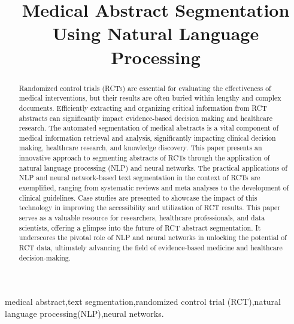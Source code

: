 \documentclass[conference]{IEEEtran}
\begin{document}
\title{Medical Abstract Segmentation Using Natural Language Processing\\}

\author{
\and
{}
\and
{}
\and
{}
}
\maketitle

\begin{abstract}
Randomized control trials (RCTs) are essential for
evaluating the effectiveness of medical interventions, but their
results are often buried within lengthy and complex documents.
Efficiently extracting and organizing critical information from
RCT abstracts can significantly impact evidence-based decision making
and healthcare research. The automated segmentation
of medical abstracts is a vital component of medical information
retrieval and analysis, significantly impacting clinical decision making,
healthcare research, and knowledge discovery. This
paper presents an innovative approach to segmenting abstracts
of RCTs through the application of natural language processing
(NLP) and neural networks. The practical applications of NLP
and neural network-based text segmentation in the context of
RCTs are exemplified, ranging from systematic reviews and meta analyses
to the development of clinical guidelines. Case studies are
presented to showcase the impact of this technology in improving
the accessibility and utilization of RCT results. This paper serves
as a valuable resource for researchers, healthcare professionals,
and data scientists, offering a glimpse into the future of RCT
abstract segmentation. It underscores the pivotal role of NLP
and neural networks in unlocking the potential of RCT data,
ultimately advancing the field of evidence-based medicine and
healthcare decision-making.

\end{abstract}
\begin{IEEEkeywords}
medical abstract,text segmentation,randomized
control trial (RCT),natural language processing(NLP),neural networks.
\end{IEEEkeywords} 
\end{document}
